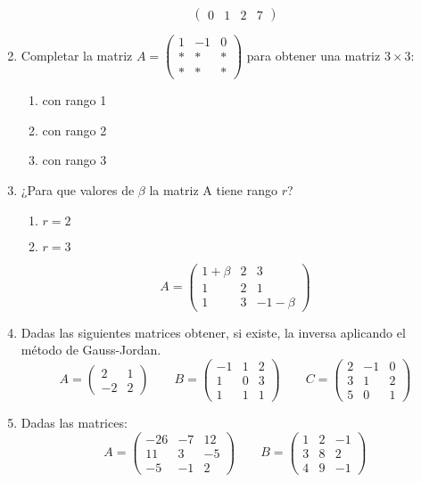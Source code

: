 \documentclass[12pt]{article}
\begin{document}
\begin{enumerate}
$$\begin{pmatrix}
  0 & 1 & 2 & 7
\end{pmatrix}
$$
\item Completar la matriz $A=\begin{pmatrix}
  1 & -1 & 0\\
  *  & * & *\\
  *  & * & *
\end{pmatrix}$ para obtener una matriz $3\times3$:
\begin{enumerate}
  \item con rango 1
  \item con rango 2
  \item con rango 3
\end{enumerate}
\item ¿Para que valores de $\beta$ la matriz A tiene rango $r$?
\begin{enumerate}
  \item $r=2$
  \item $r=3$
\end{enumerate}
  $$
  A=\begin{pmatrix}
    1+\beta & 2 & 3\\
    1 & 2 & 1\\
    1 & 3 & -1-\beta
  \end{pmatrix}
  $$
  \item Dadas las siguientes matrices obtener, si existe, la inversa aplicando el método de Gauss-Jordan.
  $$
A=\begin{pmatrix}
2 & 1\\
-2 & 2
\end{pmatrix} \qquad B=\begin{pmatrix}
-1 & 1 & 2\\
1 & 0 & 3\\
1 & 1 & 1
\end{pmatrix}\qquad C=\begin{pmatrix}
2 & -1 & 0\\
3 & 1 & 2\\
5 & 0 & 1
\end{pmatrix}
  $$
\item Dadas las matrices:
$$
A=\begin{pmatrix}
  -26 & -7 & 12\\
  11 & 3 & -5\\
  -5 & -1 & 2
\end{pmatrix}\qquad B=\begin{pmatrix}
  1 & 2& -1\\
  3 & 8 & 2\\
  4 & 9 & -1
\end{pmatrix}
$$
\end{enumerate}
\end{document}
